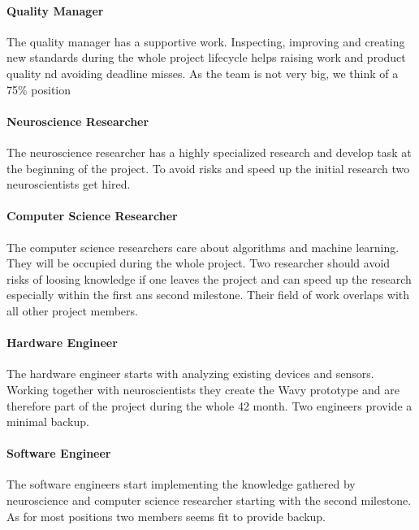 \paragraph{Quality Manager}
The quality manager has a supportive work. Inspecting, improving and creating new standards during the whole project lifecycle helps raising work and product quality nd avoiding deadline misses. As the team is not very big, we think of a 75\% position %

\paragraph{Neuroscience Researcher}
The neuroscience researcher has a highly specialized research and develop task at the beginning of the project. To avoid risks and speed up the initial research two neuroscientists get hired.

\paragraph{Computer Science Researcher}
The computer science researchers care about algorithms and machine learning. They will be occupied  during the whole project. Two researcher should avoid risks of loosing knowledge if one leaves the project and can speed up the research especially within the first ans second milestone. Their field of work overlaps with all other project members.

\paragraph{Hardware Engineer}
The hardware engineer starts with analyzing existing devices and sensors. Working together with neuroscientists they create the Wavy prototype and are therefore part of the project during the whole 42 month. Two engineers provide a minimal backup.

\paragraph{Software Engineer}
The software engineers start implementing the knowledge gathered by neuroscience and computer science researcher starting with the second milestone. As for most positions two members seems fit to provide backup.



